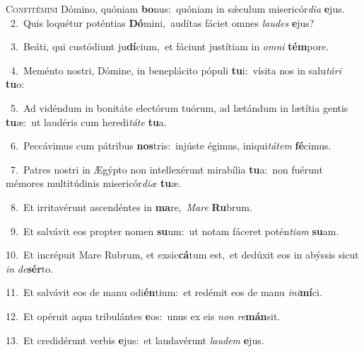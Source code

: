 \lettrine{\initial\textcolor{\initialcolor}{C}}{onfitémini} Dómino, quóniam \textbf{bo}\-nus:~\star quóniam in sǽculum misericór\-\textit{di}\-\textit{a} \textbf{e}\-jus.\\
{\numbfont\textcolor{\numbcolor}{~2.}}~Quis loquétur poténtias \textbf{Dó}\-mini,~\star audítas fáciet omnes \textit{lau}\-\textit{des} \textbf{e}\-jus?\par
{\numbfont\textcolor{\numbcolor}{~3.}}~Beáti, qui custódiunt ju\-\textbf{dí}\-cium,~\star et fáciunt justítiam in \textit{om}\-\textit{ni} \textbf{tém}\-pore.\par
{\numbfont\textcolor{\numbcolor}{~4.}}~Meménto nostri, Dómine, in beneplácito pópuli \textbf{tu}\-i:~\star vísita nos in salu\-\textit{tá}\-\textit{ri} \textbf{tu}\-o:\par
{\numbfont\textcolor{\numbcolor}{~5.}}~Ad vidéndum in bonitáte electórum tuórum, ad lætándum in lætítia gentis \textbf{tu}\-æ:~\star ut laudéris cum heredi\-\textit{tá}\-\textit{te} \textbf{tu}\-a.\par
{\numbfont\textcolor{\numbcolor}{~6.}}~Peccávimus cum pátribus \textbf{nos}\-tris:~\star injúste égimus, iniqui\-\textit{tá}\-\textit{tem} \textbf{fé}\-cimus.\par
{\numbfont\textcolor{\numbcolor}{~7.}}~Patres nostri in Ægýpto non intellexérunt mirabília \textbf{tu}\-a:~\star non fuérunt mémores multitúdinis misericór\-\textit{di}\-\textit{æ} \textbf{tu}\-æ.\par
{\numbfont\textcolor{\numbcolor}{~8.}}~Et irritavérunt ascendéntes in \textbf{ma}\-re,~\star \textit{Ma}\-\textit{re} \textbf{Ru}\-brum.\par
{\numbfont\textcolor{\numbcolor}{~9.}}~Et salvávit eos propter nomen \textbf{su}\-um:~\star ut notam fáceret potén\-\textit{ti}\-\textit{am} \textbf{su}\-am.\par
{\numbfont\textcolor{\numbcolor}{10.}}~Et incrépuit Mare Rubrum, et exsic\-\textbf{cá}\-tum est,~\star et dedúxit eos in abýssis sicut \textit{in} \textit{de}\-\textbf{sér}to.\par
{\numbfont\textcolor{\numbcolor}{11.}}~Et salvávit eos de manu odi\-\textbf{én}\-tium:~\star et redémit eos de manu \textit{in}\-\textit{i}\textbf{mí}ci.\par
{\numbfont\textcolor{\numbcolor}{12.}}~Et opéruit aqua tribulántes \textbf{e}\-os:~\star unus ex eis \textit{non} \textit{re}\-\textbf{mán}sit.\par
{\numbfont\textcolor{\numbcolor}{13.}}~Et credidérunt verbis \textbf{e}\-jus:~\star et laudavérunt \textit{lau}\-\textit{dem} \textbf{e}\-jus.\par
